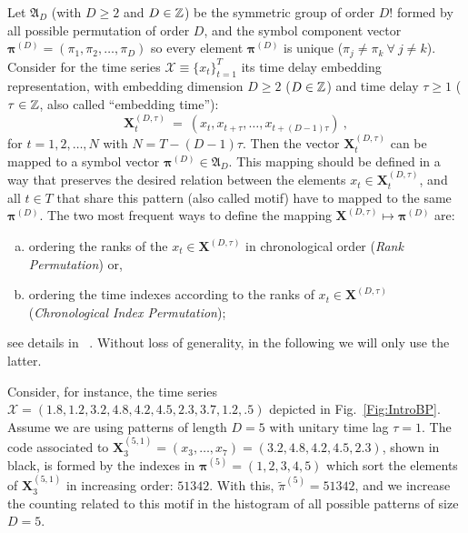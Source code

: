 \documentclass[sts]{imsart}
\begin{document}
Let ${\mathfrak A}_{D}$ (with $D \geq 2$ and $D \in {\Bbb Z}$) be the symmetric group of order $D!$ formed by all 
possible permutation of order $D$, and the symbol component vector 
${\bm \pi}^{(D)} = (\pi_1, \pi_2, \dots, \pi_D)$ so every element ${\bm \pi}^{(D)}$ is unique 
($\pi_j \neq \pi_k~\forall~j \neq k$). 
Consider for the time series ${\mathcal X} \equiv \{x_t\}_{t=1}^{T}$ its time delay embedding representation,
with embedding dimension $D \geq 2$ ($D \in {\Bbb Z}$) and time delay $\tau \geq 1$ ($\tau \in {\Bbb Z}$, also called ``embedding time''):
\begin{equation} 
\label{eq:time-delay}
{\mathbf X}^{(D,\tau)}_t ~=~( x_t,x_{t+\tau},\dots,x_{t+(D-1)\tau} ) \ ,
\end{equation} 
for $t = 1,2,\dots,N$ with $N = T-(D-1) \tau$.
Then the vector ${\mathbf X}^{(D,\tau)}_t$ can be mapped to a symbol vector ${\bm \pi}^{(D)} \in {\mathfrak A}_{D}$. 
This mapping should be defined in a way that preserves the desired relation between the elements 
$x_t  \in {\mathbf X}^{(D,\tau)}_t$, and all $t \in T$ that share this pattern (also called motif) have to mapped to the same 
${\bm \pi}^{(D)}$. 
The two most frequent ways to define the mapping ${\mathbf X}^{(D,\tau)} \mapsto {\bm \pi}^{(D)}$ are:  
\begin{enumerate}[a)]
\item ordering the ranks of the $x_t \in {\mathbf X}^{(D,\tau)}$ in chronological order 
       (\textit{Rank Permutation}) or,
\item ordering the time indexes according to the ranks of $x_t \in {\mathbf X}^{(D,\tau)}$  
       (\textit{Chronological Index Permutation});
\end{enumerate}
       see details in \citeauthor{BPRepeatedValuesChaos}~.
Without loss of generality, in the following we will only use the latter.

Consider, for instance, the time series $\mathcal X = (1.8, 1.2, 3.2, 4.8, 4.2, 4.5, 2.3, 3.7, 1.2, .5)$ depicted in Fig.~\ref{Fig:IntroBP}.
Assume we are using patterns of length $D=5$ with unitary time lag $\tau=1$.
The code associated to $\mathbf X_{3}^{(5,1)}=(x_3,\dots,x_7)=(3.2, 4.8, 4.2, 4.5, 2.3)$, shown in black, is formed by the indexes in $\bm\pi^{(5)}=(1,2,3,4,5)$ which sort the elements of $\mathbf X_{3}^{(5,1)}$ in increasing order: $51342$.
With this, $\widetilde{\pi}^{(5)} = 51342$, and we increase the counting related to this motif in the histogram of all possible patterns of size $D=5$.
\end{document}
